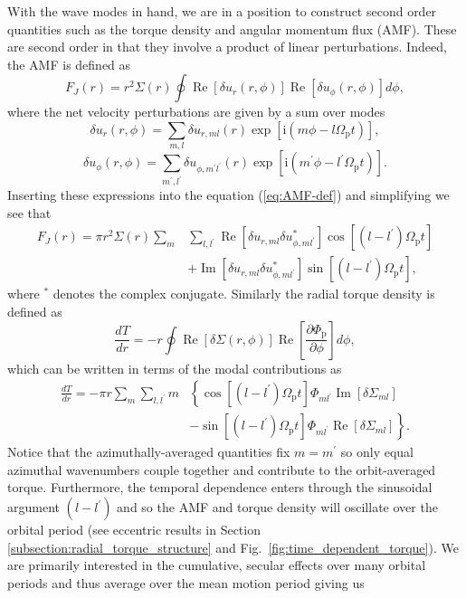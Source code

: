 With the wave modes in hand, we are in a position to construct second order quantities such as the torque density and angular momentum flux (AMF). These are second order in that they involve a product of linear perturbations. Indeed, the AMF is defined as 
%
\begin{equation}
    F_{J}(r)  = r^2 \Sigma(r) \oint \operatorname{Re}[\delta u_r(r,\phi)] \operatorname{Re}[\delta u_\phi (r,\phi)] d\phi ,
    \label{eq:AMF-def}
\end{equation}
%
where the net velocity perturbations are given by a sum over modes
%
\begin{equation}
    \delta u_r(r,\phi) = \sum_{m,l} \delta u_{r,ml}(r) \exp{[\mathrm{i}(m\phi-l\Omega_\textrm{p} t)]},
\end{equation}
\begin{equation}
    \delta u_\phi(r,\phi) = \sum_{m^\prime,l^\prime} \delta u_{\phi,m^\prime l^\prime}(r) \exp{[\mathrm{i}(m^\prime\phi-l^\prime\Omega_\textrm{p} t)]}.
\end{equation}
%
Inserting these expressions into the equation (\ref{eq:AMF-def}) and simplifying we see that 
%
\begin{align}
    F_{J}(r)  = \pi r^2 \Sigma(r) \sum_{m} & \sum_{l,l^\prime} \operatorname{Re}[\delta u_{r, ml} \delta u_{\phi, ml^\prime}^{*}] \cos[(l-l^\prime)\Omega_\textrm{p}t]\nonumber\\
    & +\operatorname{Im}[\delta u_{r, ml} \delta u_{\phi, ml^\prime}^{*}] \sin[(l-l^\prime)\Omega_\textrm{p}t],
\end{align}
%
where $^{*}$ denotes the complex conjugate. Similarly the radial torque density is defined as
%
\begin{equation}
    \frac{dT}{dr} = -r \oint \operatorname{Re}[\delta\Sigma(r,\phi)]\operatorname{Re}\left[\frac{\partial \Phi_\textrm{p}}{\partial\phi}\right]d\phi ,
\end{equation}
%
which can be written in terms of the modal contributions as
%
\begin{align}
\frac{dT}{dr} = -\pi r \sum_{m} \sum_{l,l^\prime} m & \left\{ \cos[(l-l^\prime)\Omega_\textrm{p}t] \Phi_{ml^\prime} \operatorname{Im} [\delta \Sigma_{ml}] \right. 
\nonumber\\
& \left. -\sin[(l-l^\prime)\Omega_\textrm{p}t] \Phi_{ml^\prime} \operatorname{Re} [\delta \Sigma_{ml}]\right\}.
\label{eq:time_dependent_dTdr}
\end{align}
%
Notice that the azimuthally-averaged quantities fix $m=m^\prime$ so only equal azimuthal wavenumbers couple together and contribute to the orbit-averaged torque. Furthermore, the temporal dependence enters through the sinusoidal argument $(l-l^\prime)$ and so the AMF and torque density will oscillate over the orbital period (see eccentric results in Section \ref{subsection:radial_torque_structure} and Fig.~\ref{fig:time_dependent_torque}). We are primarily interested in the cumulative, secular effects over many orbital periods and thus average over the mean motion period giving us
